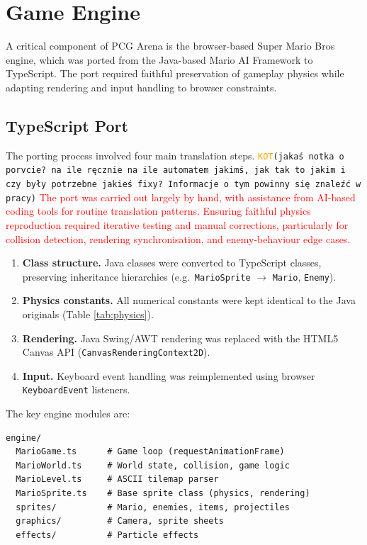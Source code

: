 \documentclass[shortabstract, mgr, english]{iithesis}
\newcommand{\DEBUG}[1]{{#1}} %
\newcommand{\KOT}[1]{\DEBUG{\tt{\textcolor{orange}{KOT}(}{#1}{)}}}
\newcommand{\changed}[1]{\textcolor{red}{#1}}
\begin{document}
\section{Game Engine}
\label{sec:sd-engine}

A critical component of PCG Arena is the browser-based Super Mario Bros engine, which was
ported from the Java-based Mario AI Framework \cite{karakovskiy2012marioai} to TypeScript.
The port required faithful preservation of gameplay physics while adapting rendering and
input handling to browser constraints.

\subsection{TypeScript Port}
\label{subsec:sd-ts-port}

The porting process involved four main translation steps. \KOT{jakaś notka o porvcie? na ile ręcznie na ile automatem jakimś, jak tak to jakim i czy były potrzebne jakieś fixy? Informacje o tym powinny się znaleźć w pracy} \changed{The port was carried
out largely by hand, with assistance from AI-based coding tools for routine
translation patterns.  Ensuring faithful physics reproduction required iterative
testing and manual corrections, particularly for collision detection, rendering
synchronisation, and enemy-behaviour edge cases.}

\begin{enumerate}
    \item \textbf{Class structure.} Java classes were converted to TypeScript classes,
          preserving inheritance hierarchies (e.g.\ \texttt{MarioSprite} $\to$
          \texttt{Mario}, \texttt{Enemy}).
    \item \textbf{Physics constants.} All numerical constants were kept identical to the
          Java originals (Table \ref{tab:physics}).
    \item \textbf{Rendering.} Java Swing/AWT rendering was replaced with the HTML5
          Canvas API (\texttt{CanvasRenderingContext2D}).
    \item \textbf{Input.} Keyboard event handling was reimplemented using browser
          \texttt{KeyboardEvent} listeners.
\end{enumerate}

The key engine modules are:

\begin{lstlisting}
engine/
  MarioGame.ts      # Game loop (requestAnimationFrame)
  MarioWorld.ts     # World state, collision, game logic
  MarioLevel.ts     # ASCII tilemap parser
  MarioSprite.ts    # Base sprite class (physics, rendering)
  sprites/          # Mario, enemies, items, projectiles
  graphics/         # Camera, sprite sheets
  effects/          # Particle effects
\end{lstlisting}
\end{document}
